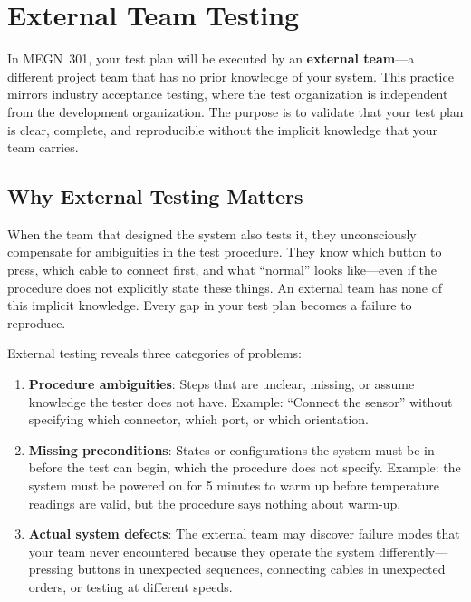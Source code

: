 \documentclass[11pt,letterpaper,twoside,openany]{book}
\begin{document}
\FloatBarrier
\section{External Team Testing}
In MEGN~301, your test plan will be executed by an \textbf{external team}---a different project team that has no prior knowledge of your system. This practice mirrors industry acceptance testing, where the test organization is independent from the development organization. The purpose is to validate that your test plan is clear, complete, and reproducible without the implicit knowledge that your team carries.

\subsection{Why External Testing Matters}
When the team that designed the system also tests it, they unconsciously compensate for ambiguities in the test procedure. They know which button to press, which cable to connect first, and what ``normal'' looks like---even if the procedure does not explicitly state these things. An external team has none of this implicit knowledge. Every gap in your test plan becomes a failure to reproduce.

External testing reveals three categories of problems:
\begin{enumerate}[leftmargin=1.5em]
\item \textbf{Procedure ambiguities}: Steps that are unclear, missing, or assume knowledge the tester does not have. Example: ``Connect the sensor'' without specifying which connector, which port, or which orientation.
\item \textbf{Missing preconditions}: States or configurations the system must be in before the test can begin, which the procedure does not specify. Example: the system must be powered on for 5 minutes to warm up before temperature readings are valid, but the procedure says nothing about warm-up.
\item \textbf{Actual system defects}: The external team may discover failure modes that your team never encountered because they operate the system differently---pressing buttons in unexpected sequences, connecting cables in unexpected orders, or testing at different speeds.
\end{enumerate}
\end{document}
